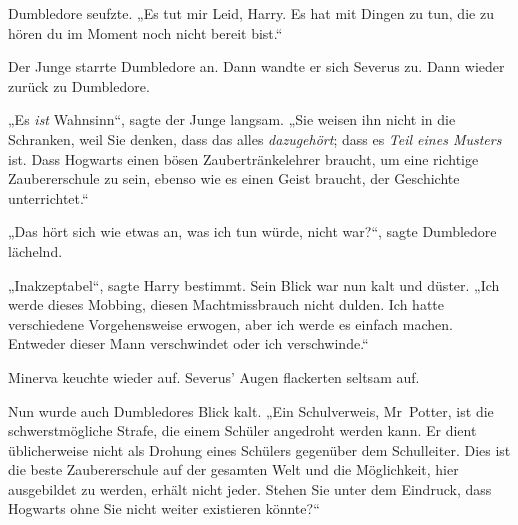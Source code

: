 Dumbledore seufzte. „Es tut mir Leid, Harry. Es hat mit Dingen zu tun, die zu hören du im Moment noch nicht bereit bist.“

Der Junge starrte Dumbledore an. Dann wandte er sich Severus zu. Dann wieder zurück zu Dumbledore.

„Es \emph{ist} Wahnsinn“, sagte der Junge langsam. „Sie weisen ihn nicht in die Schranken, weil Sie denken, dass das alles \emph{dazugehört}; dass es \emph{Teil eines Musters} ist. Dass Hogwarts einen bösen Zaubertränkelehrer braucht, um eine richtige Zaubererschule zu sein, ebenso wie es einen Geist braucht, der Geschichte unterrichtet.“

„Das hört sich wie etwas an, was ich tun würde, nicht war?“, sagte Dumbledore lächelnd.

„Inakzeptabel“, sagte Harry bestimmt. Sein Blick war nun kalt und düster. „Ich werde dieses Mobbing, diesen Machtmissbrauch nicht dulden. Ich hatte verschiedene Vorgehensweise erwogen, aber ich werde es einfach machen. Entweder dieser Mann verschwindet oder ich verschwinde.“

Minerva keuchte wieder auf. Severus’ Augen flackerten seltsam auf.

Nun wurde auch Dumbledores Blick kalt. „Ein Schulverweis, Mr~Potter, ist die schwerstmögliche Strafe, die einem Schüler angedroht werden kann. Er dient üblicherweise nicht als Drohung eines Schülers gegenüber dem Schulleiter. Dies ist die beste Zaubererschule auf der gesamten Welt und die Möglichkeit, hier ausgebildet zu werden, erhält nicht jeder. Stehen Sie unter dem Eindruck, dass Hogwarts ohne Sie nicht weiter existieren könnte?“

